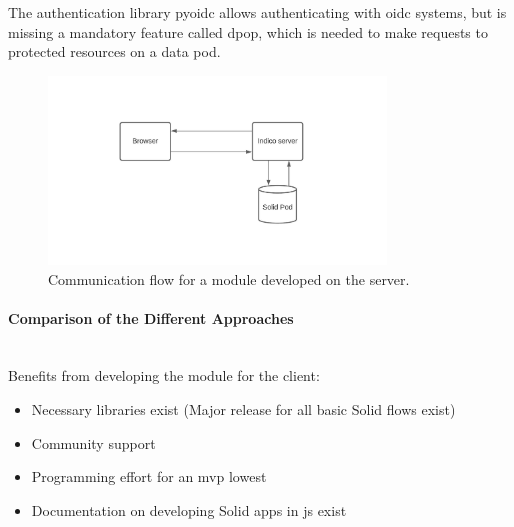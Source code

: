 The authentication library pyoidc allows authenticating with \gls{oidc} systems, but is missing a mandatory feature called \gls{dpop}, which is needed to make requests to protected resources on a data pod.

\begin{figure}
    \centering
    \includegraphics[width=0.8\textwidth]{prototype/graphs/poc-infrastructure-backend.jpeg}
    \caption{Communication flow for a module developed on the server.}
    \label{fig:poc-infrastructure-backend}
\end{figure}

\paragraph{Comparison of the Different Approaches}\mbox{}\\

Benefits from developing the module for the client:

\begin{itemize}
    \item Necessary libraries exist (Major release for all basic Solid flows exist)
    \item Community support
    \item Programming effort for an \gls{mvp} lowest
    \item Documentation on developing Solid apps in \gls{js} exist
\end{itemize}


